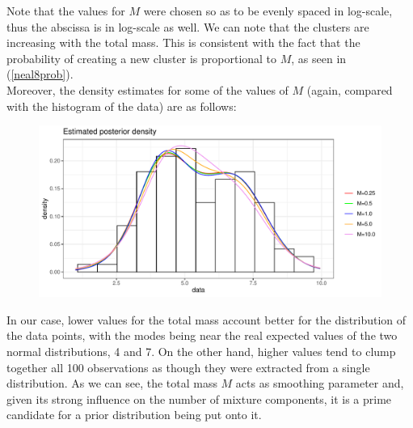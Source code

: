 Note that the values for $M$ were chosen so as to be evenly spaced in log-scale, thus the abscissa is in log-scale as well.
We can note that the clusters are increasing with the total mass.
This is consistent with the fact that the probability of creating a new cluster is proportional to $M$, as seen in (\ref{neal8prob}). \\
Moreover, the density estimates for some of the values of $M$ (again, compared with the histogram of the data) are as follows:
\clearpage
\begin{figure}[h]
	\centering
	\includegraphics[scale=0.7]{etc/dens_withMm3.pdf}
\end{figure}

In our case, lower values for the total mass account better for the distribution of the data points, with the modes being near the real expected values of the two normal distributions, 4 and 7.
On the other hand, higher values tend to clump together all 100 observations as though they were extracted from a single distribution.
As we can see, the total mass $M$ acts as smoothing parameter and, given its strong influence on the number of mixture components, it is a prime candidate for a prior distribution being put onto it.

\clearpage

